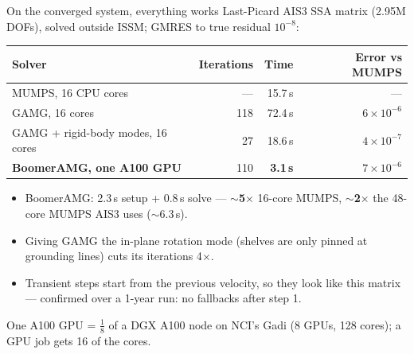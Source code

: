 \documentclass[10pt,aspectratio=169]{beamer}
\newcommand{\good}[1]{\textcolor{green!55!black}{\textbf{#1}}}
\begin{document}
\begin{frame}{On the converged system, everything works}
  Last-Picard AIS3 SSA matrix (2.95M DOFs), solved outside ISSM;
  GMRES to true residual $10^{-8}$:
  \begin{center}
  \small
  \begin{tabular}{lrrr}
    \toprule
    Solver & Iterations & Time & Error vs MUMPS \\
    \midrule
    MUMPS, 16 CPU cores                       & --- & 15.7\,s & --- \\
    GAMG, 16 cores                            & 118 & 72.4\,s & $6\times10^{-6}$ \\
    GAMG + rigid-body modes, 16 cores         & 27  & 18.6\,s & $4\times10^{-7}$ \\
    \textbf{BoomerAMG, one A100 GPU}          & 110 & \good{3.1\,s} & $7\times10^{-6}$ \\
    \bottomrule
  \end{tabular}
  \end{center}
  \begin{itemize}
    \item BoomerAMG: 2.3\,s setup + 0.8\,s solve --- \good{$\sim$5$\times$} 16-core
          MUMPS, \good{$\sim$2$\times$} the 48-core MUMPS AIS3 uses ($\sim$6.3\,s).
    \item Giving GAMG the in-plane rotation mode (shelves are only pinned at
          grounding lines) cuts its iterations 4$\times$.
    \item Transient steps start from the previous velocity, so they look like this
          matrix --- confirmed over a 1-year run: no fallbacks after step 1.
  \end{itemize}
  {\scriptsize One A100 GPU = $\tfrac18$ of a DGX A100 node on NCI's Gadi (8 GPUs, 128 cores);
  a GPU job gets 16 of the cores.}
\end{frame}
\end{document}
